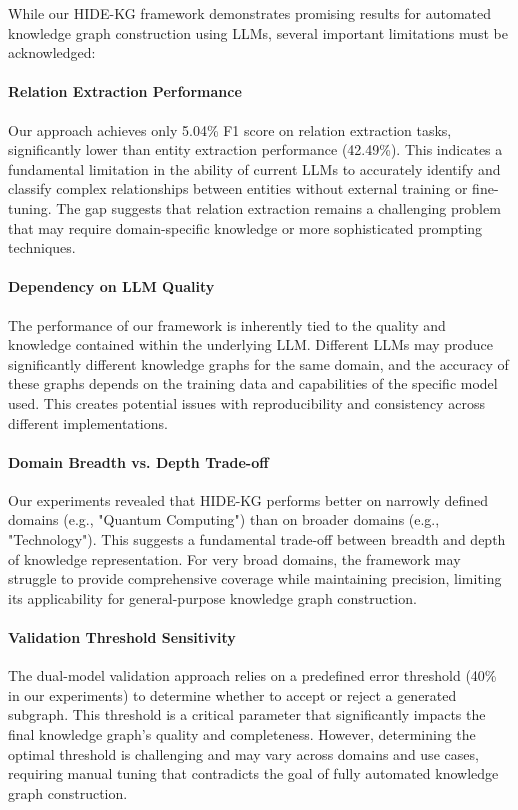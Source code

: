 \documentclass[11pt]{article}
\begin{document}
While our HIDE-KG framework demonstrates promising results for automated knowledge graph construction using LLMs, several important limitations must be acknowledged:

\paragraph{Relation Extraction Performance} Our approach achieves only 5.04\% F1 score on relation extraction tasks, significantly lower than entity extraction performance (42.49\%). This indicates a fundamental limitation in the ability of current LLMs to accurately identify and classify complex relationships between entities without external training or fine-tuning. The gap suggests that relation extraction remains a challenging problem that may require domain-specific knowledge or more sophisticated prompting techniques.

\paragraph{Dependency on LLM Quality} The performance of our framework is inherently tied to the quality and knowledge contained within the underlying LLM. Different LLMs may produce significantly different knowledge graphs for the same domain, and the accuracy of these graphs depends on the training data and capabilities of the specific model used. This creates potential issues with reproducibility and consistency across different implementations.

\paragraph{Domain Breadth vs. Depth Trade-off} Our experiments revealed that HIDE-KG performs better on narrowly defined domains (e.g., "Quantum Computing") than on broader domains (e.g., "Technology"). This suggests a fundamental trade-off between breadth and depth of knowledge representation. For very broad domains, the framework may struggle to provide comprehensive coverage while maintaining precision, limiting its applicability for general-purpose knowledge graph construction.

\paragraph{Validation Threshold Sensitivity} The dual-model validation approach relies on a predefined error threshold (40\% in our experiments) to determine whether to accept or reject a generated subgraph. This threshold is a critical parameter that significantly impacts the final knowledge graph's quality and completeness. However, determining the optimal threshold is challenging and may vary across domains and use cases, requiring manual tuning that contradicts the goal of fully automated knowledge graph construction.
\end{document}
